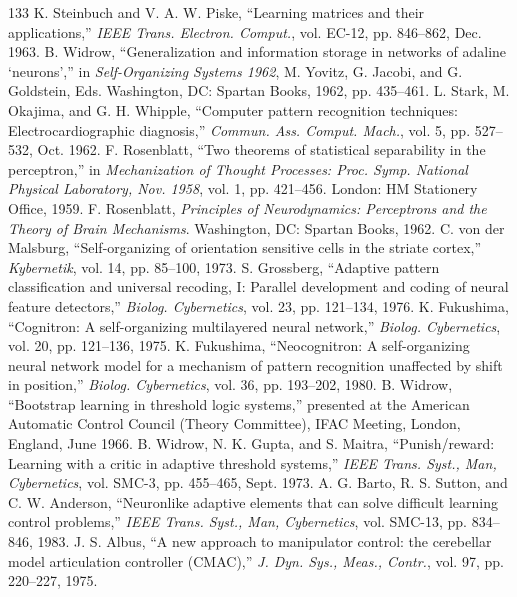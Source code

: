 \documentclass[10pt,twocolumn]{article}
\begin{document}
\begin{thebibliography}{133}
\small
{} K. Steinbuch and V. A. W. Piske, ``Learning matrices and their applications,'' \textit{IEEE Trans. Electron. Comput.}, vol. EC-12, pp. 846--862, Dec. 1963.
 B. Widrow, ``Generalization and information storage in networks of adaline `neurons','' in \textit{Self-Organizing Systems 1962}, M. Yovitz, G. Jacobi, and G. Goldstein, Eds. Washington, DC: Spartan Books, 1962, pp. 435--461.
 L. Stark, M. Okajima, and G. H. Whipple, ``Computer pattern recognition techniques: Electrocardiographic diagnosis,'' \textit{Commun. Ass. Comput. Mach.}, vol. 5, pp. 527--532, Oct. 1962.
 F. Rosenblatt, ``Two theorems of statistical separability in the perceptron,'' in \textit{Mechanization of Thought Processes: Proc. Symp. National Physical Laboratory, Nov. 1958}, vol. 1, pp. 421--456. London: HM Stationery Office, 1959.
 F. Rosenblatt, \textit{Principles of Neurodynamics: Perceptrons and the Theory of Brain Mechanisms}. Washington, DC: Spartan Books, 1962.
 C. von der Malsburg, ``Self-organizing of orientation sensitive cells in the striate cortex,'' \textit{Kybernetik}, vol. 14, pp. 85--100, 1973.
 S. Grossberg, ``Adaptive pattern classification and universal recoding, I: Parallel development and coding of neural feature detectors,'' \textit{Biolog. Cybernetics}, vol. 23, pp. 121--134, 1976.
 K. Fukushima, ``Cognitron: A self-organizing multilayered neural network,'' \textit{Biolog. Cybernetics}, vol. 20, pp. 121--136, 1975.
 K. Fukushima, ``Neocognitron: A self-organizing neural network model for a mechanism of pattern recognition unaffected by shift in position,'' \textit{Biolog. Cybernetics}, vol. 36, pp. 193--202, 1980.
 B. Widrow, ``Bootstrap learning in threshold logic systems,'' presented at the American Automatic Control Council (Theory Committee), IFAC Meeting, London, England, June 1966.
 B. Widrow, N. K. Gupta, and S. Maitra, ``Punish/reward: Learning with a critic in adaptive threshold systems,'' \textit{IEEE Trans. Syst., Man, Cybernetics}, vol. SMC-3, pp. 455--465, Sept. 1973.
 A. G. Barto, R. S. Sutton, and C. W. Anderson, ``Neuronlike adaptive elements that can solve difficult learning control problems,'' \textit{IEEE Trans. Syst., Man, Cybernetics}, vol. SMC-13, pp. 834--846, 1983.
 J. S. Albus, ``A new approach to manipulator control: the cerebellar model articulation controller (CMAC),'' \textit{J. Dyn. Sys., Meas., Contr.}, vol. 97, pp. 220--227, 1975.

\end{thebibliography}
\end{document}
